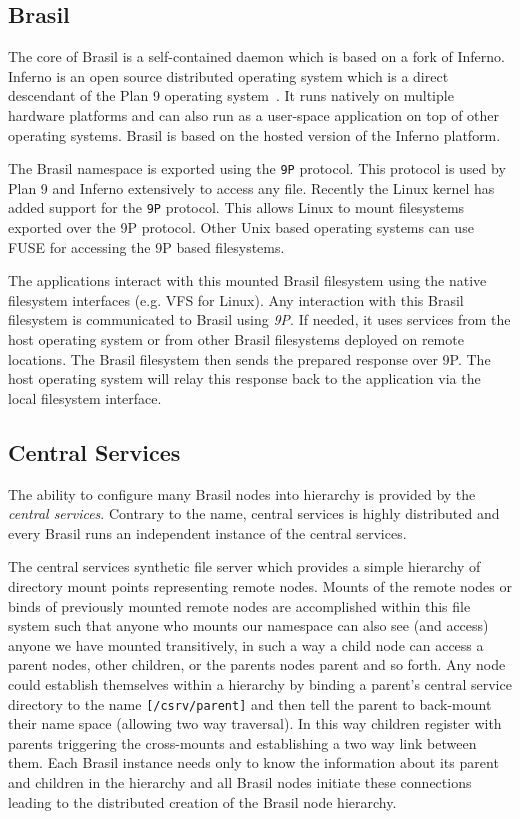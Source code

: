 \subsection{Brasil}

The core of Brasil is a self-contained daemon which is based on a fork of
Inferno.
Inferno\cite{inferno} is an open source distributed operating system 
which is a direct descendant of the Plan 9 operating system~\cite{pike1995pbl}.  
It runs natively on
multiple hardware platforms and can also run as a user-space application on
top of other operating systems.
Brasil is based on the hosted version of the Inferno platform.

The Brasil namespace is exported using the \texttt{9P} protocol. 
This protocol is used by Plan 9 and Inferno extensively to access any file. 
Recently the Linux kernel has added support for the \texttt{9P}
protocol\cite{graverobbers}.  This allows Linux to mount filesystems
exported over the 9P protocol.  Other Unix based operating systems can use
FUSE\cite{FUSE} for accessing the 9P based filesystems. 

The applications interact with this mounted Brasil filesystem using the native
filesystem interfaces (e.g. VFS for Linux). Any interaction with this Brasil
filesystem is communicated to Brasil using \textit{9P}. 
If needed, it uses services from the host operating system or from other Brasil
filesystems deployed on remote locations.  The Brasil filesystem then sends the
prepared response over 9P. The host operating system will relay this response
back to the application via the local filesystem interface.

\subsection{Central Services}

The ability to configure many Brasil nodes into hierarchy is provided by the
\textit{central services}.  Contrary to the name, central services is
highly distributed and every Brasil runs an independent instance of the central
services.  

The central services synthetic file server which provides a simple hierarchy of
directory mount points representing remote nodes.  Mounts of the remote nodes
or binds of previously mounted remote nodes are accomplished within this file
system such that anyone who mounts our namespace can also see (and
access) anyone we have mounted transitively,  in such a way a child
node can access a parent nodes, other children, or the parents nodes
parent and so forth. Any node could establish themselves within a
hierarchy by binding a parent's central service directory to the name
\texttt{[/csrv/parent]} and then tell the parent to back-mount their name space
(allowing two way traversal).  In this way children register with parents
triggering the cross-mounts and establishing a two way link between them. Each
Brasil instance needs only to know the information about its parent and children
in the hierarchy and all Brasil nodes initiate these connections leading to
the distributed creation of the Brasil node hierarchy.
 
